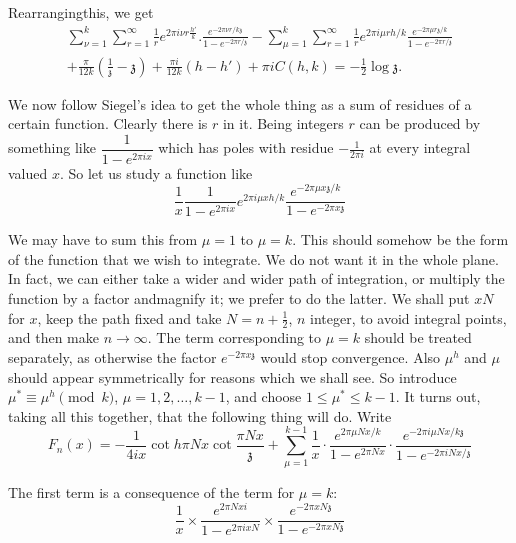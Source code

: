 Rearranging\pageoriginale this, we get
\begin{multline*}
  \sum^k_{\nu =1} \sum^\infty_{r=1} \frac{1}{r} e^{2 \pi i \nu r
    \frac{h'}{k}}. \frac{e^{- 2 \pi \nu r/k\mathfrak{z}}}{1- e^{-2 \pi
    r/\mathfrak{z}}} - \sum^k_{\mu =1} \sum^\infty_{r=1} \frac{1}{r}
  e^{2 \pi i\mu r h/k} \frac{e^{- 2 \pi \mu r \mathfrak{z}/k}}{1- e^{-
      2 \pi r/\mathfrak{z}}}\\
  + \frac{\pi}{12 k} \left( \frac{1}{\mathfrak{z}} -
  \mathfrak{z}\right) + \frac{\pi i}{12k} (h- h') + \pi i C(h, k) = -
  \frac{1}{2}  \log \mathfrak{z}.
\end{multline*}

We now follow Siegel's idea to get the whole thing as a sum of
residues of a certain function. Clearly there is $r$ in it. Being
integers $r$ can be produced by something like $\dfrac{1}{1- e^{2 \pi
  i x}}$ which has poles with residue $- \frac{1}{2 \pi i}$ at every
integral valued $x$. So let us study a function like
$$
\frac{1}{x} \frac{1}{1- e^{2 \pi i x}} e^{2 \pi i \mu x h/k} \frac{e^{-
  2 \pi \mu x \mathfrak{z}/k}}{1-e^{-2 \pi x \mathfrak{z}}}
$$

We may have to sum this from $\mu =1$ to $\mu =k$. This should somehow
be the form of the function that we wish to integrate. We do not want
it in the whole plane. In fact, we can either take a wider and wider
path of integration, or multiply the function by a factor
and\pageoriginale magnify it; we prefer to do the latter. We shall
put $xN$ for $x$, keep the path fixed and take $N= n + \frac{1}{2}$,
$n$ integer, to avoid integral points, and then make $n \to
\infty$. The term corresponding to $\mu =k$ should be treated
separately, as otherwise the factor $e^{- 2 \pi x \mathfrak{z}}$ would
stop convergence. Also $\mu^h$ and $\mu$ should appear symmetrically
for reasons which we shall see. So introduce $\mu^* \equiv \mu^h
\pmod{k}$, $\mu = 1, 2, \ldots, k-1$, and choose $1 \leq \mu^* \leq
k-1$. It turns out, taking all this together, that the following thing
will do. Write
$$
F_n (x) =- \frac{1}{4 ix} \cot h \pi N x \cot \frac{\pi N
  x}{\mathfrak{z}} + \sum^{k-1}_{\mu =1} \frac{1}{x} \cdot \frac{e^{2 \pi
    \mu Nx/k}}{1- e^{2 \pi N x}} \cdot  \frac{e^{- 2 \pi i \mu N x/k
    \mathfrak{z}}}{1-e^{-2\pi i N x/\mathfrak{z}}}
$$

The first term is a consequence of the term for $\mu = k$:
$$
\frac{1}{x} \times \frac{e^{2 \pi N x i}}{1- e^{2 \pi i x N}} \times
\frac{e^{- 2 \pi x N \mathfrak{z}}}{1- e^{- 2 \pi x N \mathfrak{z}}}
$$

